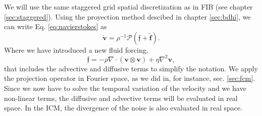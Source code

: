 \documentclass[twoside,openright,titlepage,numbers=noenddot,%
headinclude,footinclude,cleardoublepage=empty,abstract=on,
BCOR=5mm,fontsize=11pt, dvipsnames, paper=b5
]{scrreprt}
\renewcommand{\vec}[1]{\bm{#1}}
\newcommand{\oper}[1]{\mathcal{#1}}
\newcommand{\fvel}{v}
\begin{document}
We will use the same staggered grid spatial discretization as in \gls{FIB} (see chapter \ref{sec:staggered}).
Using the proyection method descibed in chapter \ref{sec:bdhi}, we can write Eq. \eqref{eq:navierstokes} as
\begin{equation}
  \dot{\vec{\fvel}} = \rho^{-1} \oper{P}\left(\vec{\mathfrak{f}} + \tilde{\vec{f}}\right).
\end{equation}
Where we have introduced a new fluid forcing,
\begin{equation}
  \vec{\mathfrak{f}} = -\rho\nabla\cdot (\vec{\fvel}\otimes\vec{\fvel}) + \eta\nabla^2\vec{\fvel},
\end{equation}
that includes the advective and diffusive terms to simplify the notation.
We apply the projection operator in Fourier space, as we did in, for instance, sec. \ref{sec:fcm}. Since we now have to solve the temporal variation of the velocity and we have non-linear terms, the diffusive and advective terms will be evaluated in real space. In the \gls{ICM}, the divergence of the noise is also evaluated in real space.
\end{document}
